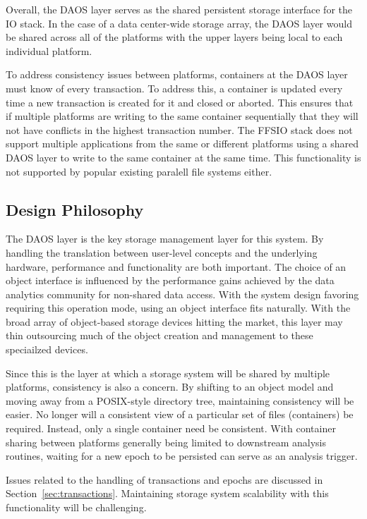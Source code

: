 \documentclass[conference]{IEEEtran} \pdfpagewidth=8.5in
\begin{document}
Overall, the DAOS layer serves as the shared persistent storage interface for
the IO stack. In the case of a data center-wide storage array, the DAOS layer
would be shared across all of the platforms with the upper layers being local
to each individual platform.

To address consistency issues between platforms, containers at the DAOS layer
must know of every transaction. To address this, a container is updated every
time a new transaction is created for it and closed or aborted. This ensures
that if multiple platforms are writing to the same container sequentially that
they will not have conflicts in the highest transaction number. The FFSIO stack
does not support multiple applications from the same or different platforms
using a shared DAOS layer to write to the same container at the same time. This
functionality is not supported by popular existing paralell file systems
either.

\subsection{Design Philosophy}

The DAOS layer is the key storage management layer for this system. By handling
the translation between user-level concepts and the underlying hardware,
performance and functionality are both important. The choice of an object
interface is influenced by the performance gains achieved by the data analytics
community for non-shared data access. With the system design favoring requiring
this operation mode, using an object interface fits naturally. With the broad
array of object-based storage devices hitting the market, this layer may thin
outsourcing much of the object creation and management to these speciailzed
devices.

Since this is the layer at which a storage system will be shared by multiple
platforms, consistency is also a concern. By shifting to an object model and
moving away from a POSIX-style directory tree, maintaining consistency will be
easier. No longer will a consistent view of a particular set of files
(containers) be required. Instead, only a single container need be consistent.
With container sharing between platforms generally being limited to downstream
analysis routines, waiting for a new epoch to be persisted can serve as an
analysis trigger.

Issues related to the handling of transactions and epochs are discussed in
Section~\ref{sec:transactions}. Maintaining storage system scalability with
this functionality will be challenging.
\end{document}
